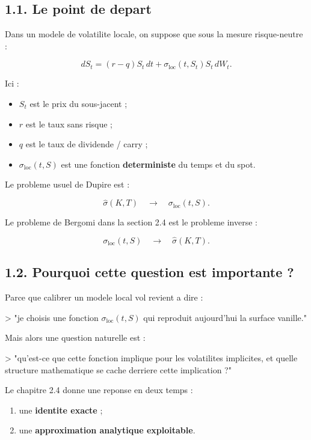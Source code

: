 \documentclass[11pt,a4paper]{article}
\begin{document}
\subsection{1.1. Le point de depart}

Dans un modele de volatilite locale, on suppose que sous la mesure risque-neutre :

\[
dS_t=(r-q)S_t\,dt+\sigma_{\mathrm{loc}}(t,S_t)S_t\,dW_t.
\]

Ici :

\begin{itemize}
\item \(S_t\) est le prix du sous-jacent ;
\item \(r\) est le taux sans risque ;
\item \(q\) est le taux de dividende / carry ;
\item \(\sigma_{\mathrm{loc}}(t,S)\) est une fonction \textbf{deterministe} du temps et du spot.
\end{itemize}

Le probleme usuel de Dupire est :

\[
\widehat{\sigma}(K,T)\quad \longrightarrow \quad \sigma_{\mathrm{loc}}(t,S).
\]

Le probleme de Bergomi dans la section 2.4 est le probleme inverse :

\[
\sigma_{\mathrm{loc}}(t,S)\quad \longrightarrow \quad \widehat{\sigma}(K,T).
\]

\subsection{1.2. Pourquoi cette question est importante ?}

Parce que calibrer un modele local vol revient a dire :

> "je choisis une fonction \(\sigma_{\mathrm{loc}}(t,S)\) qui reproduit aujourd'hui la surface vanille."

Mais alors une question naturelle est :

> "qu'est-ce que cette fonction implique pour les volatilites implicites, et quelle structure mathematique se cache derriere cette implication ?"

Le chapitre 2.4 donne une reponse en deux temps :

\begin{enumerate}
\item une \textbf{identite exacte} ;
\item une \textbf{approximation analytique exploitable}.
\end{enumerate}
\end{document}
